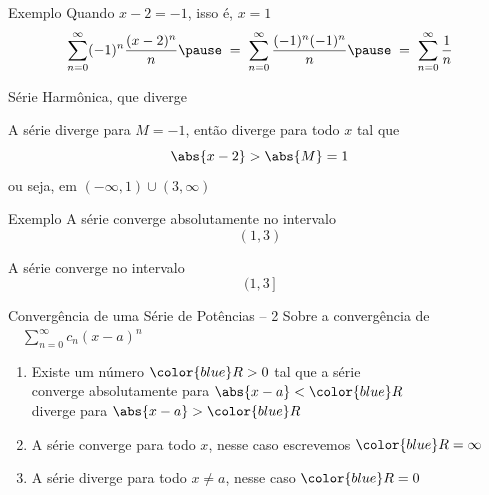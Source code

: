 \begin{frame}{Exemplo \theexemplo}
  Quando \(x-2=-1\), isso é, \(x=1\)
  \pause
  \[
    \sum_{n=0}^\infty (-1)^n\frac{(x-2)^n}{n}
    \pause
    \;=\;
    \sum_{n=0}^\infty \frac{(-1)^n(-1)^n}{n}
    \pause
    \;=\;
    \sum_{n=0}^\infty \frac{1}{n}
  \]

  \pause
  Série Harmônica, que diverge

  \pause
  \vspace{\baselineskip}
  A série diverge para
  \( M = -1 \)\pause,
  então diverge para todo \(x\) tal que
  \[
    \abs{x-2} > \abs{M} = 1
  \]
  \pause
  ou seja, em
  \(
    (-\infty, 1) \cup (3, \infty)
  \)
\end{frame}

\begin{frame}{Exemplo \theexemplo}
  A série converge absolutamente no intervalo
  \[
    (1, 3)
  \]

  \pause
  A série converge no intervalo
  \[
    (1, 3\,]
  \]
\end{frame}

\begin{frame}{Convergência de uma Série de Potências -- 2}
  Sobre a convergência de
  \(\quad\sum_{n=0}^\infty c_n(x-a)^n\quad\)

  \pause
  \vspace{\baselineskip}
  \begin{enumerate}[<+->]
    \item Existe um número ${\color{blue}R>0}$ tal que a série \\[1mm]
          \tabto{10mm} converge absolutamente para \tabto{70mm} \(\abs{x-a}<{\color{blue}R}\) \\
          \tabto{10mm} diverge para                \tabto{70mm} \(\abs{x-a}>{\color{blue}R}\)
    \vspace{\baselineskip}
    \item A série converge para todo $x$, nesse caso escrevemos ${\color{blue}R=\infty}$
    \vspace{\baselineskip}
    \item A série diverge para todo $x\neq a$, nesse caso ${\color{blue}R=0}$
  \end{enumerate}
\end{frame}

